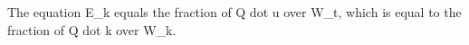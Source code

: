 The equation E_k equals the fraction of Q dot u over W_t, which is equal to the fraction of Q dot k over W_k.